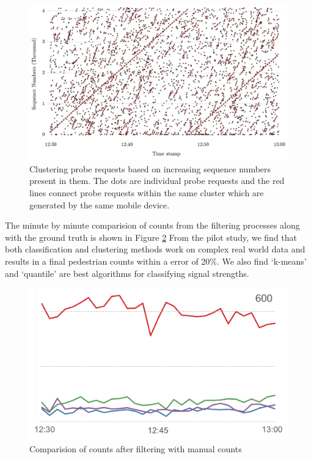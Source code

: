 \begin{figure}
	\begin{center}
		\includegraphics [width=\linewidth] {images/pilot_clustering.jpeg}
		\caption{Clustering probe requests based on increasing sequence numbers present in them. The dots are individual probe requests and the red lines connect probe requests within the same cluster which are generated by the same mobile device.}
		\label{pilot_clustering}
	\end{center}
\end{figure}

The minute by minute comparision of counts from the filtering processes along with the ground truth is shown in Figure \ref{pilot_comparison} From the pilot study, we find that both classification and clustering methods work on complex real world data and results in a final pedestrian counts within a error of 20\%.
We also find `k-means' and `quantile' are best algorithms for classifying signal strengths.

\begin{figure}
	\begin{center}
		\includegraphics [width=0.85\linewidth] {images/pilot_counts_comparision.png}
		\caption{Comparision of counts after filtering with manual counts}
		\label{pilot_comparison}
	\end{center}
\end{figure}


